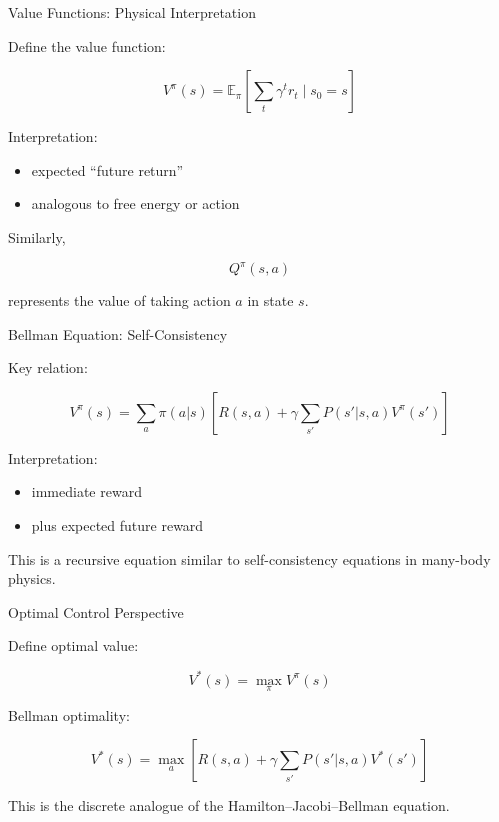 \documentclass{beamer}
\begin{document}
\begin{frame}{Value Functions: Physical Interpretation}

Define the value function:

\[
V^\pi(s) = \mathbb{E}_\pi\left[\sum_t \gamma^t r_t \mid s_0=s\right]
\]

Interpretation:

\begin{itemize}
\item expected ``future return''
\item analogous to free energy or action
\end{itemize}

Similarly,

\[
Q^\pi(s,a)
\]

represents the value of taking action $a$ in state $s$.

\end{frame}

\begin{frame}{Bellman Equation: Self-Consistency}

Key relation:

\[
V^\pi(s) = \sum_a \pi(a|s)\left[
R(s,a) + \gamma \sum_{s'} P(s'|s,a)V^\pi(s')
\right]
\]

Interpretation:

\begin{itemize}
\item immediate reward
\item plus expected future reward
\end{itemize}

This is a recursive equation similar to
self-consistency equations in many-body physics.

\end{frame}

\begin{frame}{Optimal Control Perspective}

Define optimal value:

\[
V^*(s) = \max_\pi V^\pi(s)
\]

Bellman optimality:

\[
V^*(s) = \max_a \left[
R(s,a) + \gamma \sum_{s'} P(s'|s,a)V^*(s')
\right]
\]

This is the discrete analogue of the
Hamilton--Jacobi--Bellman equation.

\end{frame}
\end{document}
